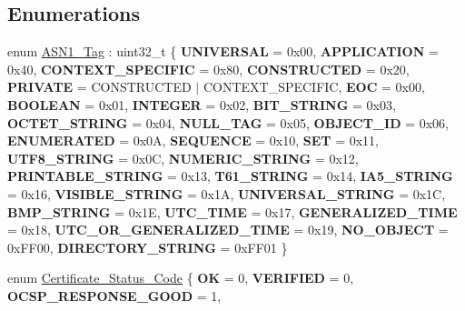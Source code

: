 \subsection*{Enumerations}
\begin{DoxyCompactItemize}
\item 
enum \hyperlink{namespace_botan_acc1ab433420bdddbcfe52dbbd94e8576}{A\+S\+N1\+\_\+\+Tag} \+: uint32\+\_\+t \{ \newline
{\bfseries U\+N\+I\+V\+E\+R\+S\+AL} = 0x00, 
{\bfseries A\+P\+P\+L\+I\+C\+A\+T\+I\+ON} = 0x40, 
{\bfseries C\+O\+N\+T\+E\+X\+T\+\_\+\+S\+P\+E\+C\+I\+F\+IC} = 0x80, 
{\bfseries C\+O\+N\+S\+T\+R\+U\+C\+T\+ED} = 0x20, 
\newline
{\bfseries P\+R\+I\+V\+A\+TE} = C\+O\+N\+S\+T\+R\+U\+C\+T\+ED $\vert$ C\+O\+N\+T\+E\+X\+T\+\_\+\+S\+P\+E\+C\+I\+F\+IC, 
{\bfseries E\+OC} = 0x00, 
{\bfseries B\+O\+O\+L\+E\+AN} = 0x01, 
{\bfseries I\+N\+T\+E\+G\+ER} = 0x02, 
\newline
{\bfseries B\+I\+T\+\_\+\+S\+T\+R\+I\+NG} = 0x03, 
{\bfseries O\+C\+T\+E\+T\+\_\+\+S\+T\+R\+I\+NG} = 0x04, 
{\bfseries N\+U\+L\+L\+\_\+\+T\+AG} = 0x05, 
{\bfseries O\+B\+J\+E\+C\+T\+\_\+\+ID} = 0x06, 
\newline
{\bfseries E\+N\+U\+M\+E\+R\+A\+T\+ED} = 0x0A, 
{\bfseries S\+E\+Q\+U\+E\+N\+CE} = 0x10, 
{\bfseries S\+ET} = 0x11, 
{\bfseries U\+T\+F8\+\_\+\+S\+T\+R\+I\+NG} = 0x0C, 
\newline
{\bfseries N\+U\+M\+E\+R\+I\+C\+\_\+\+S\+T\+R\+I\+NG} = 0x12, 
{\bfseries P\+R\+I\+N\+T\+A\+B\+L\+E\+\_\+\+S\+T\+R\+I\+NG} = 0x13, 
{\bfseries T61\+\_\+\+S\+T\+R\+I\+NG} = 0x14, 
{\bfseries I\+A5\+\_\+\+S\+T\+R\+I\+NG} = 0x16, 
\newline
{\bfseries V\+I\+S\+I\+B\+L\+E\+\_\+\+S\+T\+R\+I\+NG} = 0x1A, 
{\bfseries U\+N\+I\+V\+E\+R\+S\+A\+L\+\_\+\+S\+T\+R\+I\+NG} = 0x1C, 
{\bfseries B\+M\+P\+\_\+\+S\+T\+R\+I\+NG} = 0x1E, 
{\bfseries U\+T\+C\+\_\+\+T\+I\+ME} = 0x17, 
\newline
{\bfseries G\+E\+N\+E\+R\+A\+L\+I\+Z\+E\+D\+\_\+\+T\+I\+ME} = 0x18, 
{\bfseries U\+T\+C\+\_\+\+O\+R\+\_\+\+G\+E\+N\+E\+R\+A\+L\+I\+Z\+E\+D\+\_\+\+T\+I\+ME} = 0x19, 
{\bfseries N\+O\+\_\+\+O\+B\+J\+E\+CT} = 0x\+F\+F00, 
{\bfseries D\+I\+R\+E\+C\+T\+O\+R\+Y\+\_\+\+S\+T\+R\+I\+NG} = 0x\+F\+F01
 \}
\item 
enum \hyperlink{namespace_botan_ae1e907dc90937bdda30f65216e68ff2b}{Certificate\+\_\+\+Status\+\_\+\+Code} \{ \newline
{\bfseries OK} = 0, 
{\bfseries V\+E\+R\+I\+F\+I\+ED} = 0, 
{\bfseries O\+C\+S\+P\+\_\+\+R\+E\+S\+P\+O\+N\+S\+E\+\_\+\+G\+O\+OD} = 1, 

\end{DoxyCompactItemize}
